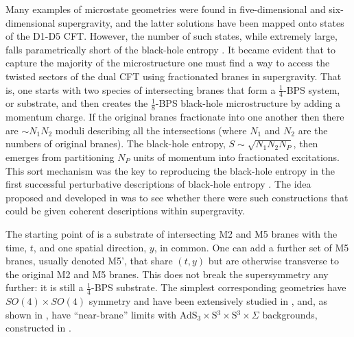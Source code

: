 \documentclass[11pt]{article}
\def\nBPS#1{$\frac{1}{#1}$-BPS}
\numberwithin{equation}{section}
\begin{document}
Many examples of microstate geometries were found in five-dimensional \cite{Giusto:2004kj,Bena:2005va,Berglund:2005vb,Bena:2006is,Bena:2006kb,Bena:2007kg,Bena:2007qc,Bena:2008wt,Bena:2010gg,Gibbons:2013tqa,Bena:2011dd, Bena:2013dka, Bianchi:2016bgx, Bianchi:2017bxl, Heidmann:2017cxt, Bena:2017fvm, Avila:2017pwi,Tyukov:2018ypq,Warner:2019jll} and six-dimensional \cite{Shigemori:2013lta,Giusto:2013bda,Bena:2015bea,Bena:2016ypk,Bena:2017geu,Bena:2017upb,Bena:2017xbt,Ceplak:2018pws,Heidmann:2019xrd,Heidmann:2019zws,Walker:2019ntz,Ganchev:2021iwy}  supergravity, and the latter solutions have been mapped onto states of the D1-D5 CFT.  However, the number of such states, while extremely large, falls parametrically short of the black-hole entropy \cite{Shigemori:2019orj,Mayerson:2020acj}.    It became evident that to capture the majority of the microstructure one must find a way to access the twisted sectors of the dual CFT using fractionated branes in supergravity.   That is, one starts with two species of intersecting branes that form  a \nBPS{4}  system, or substrate, and then creates the  \nBPS{8} black-hole microstructure by adding a momentum charge.   If the original branes fractionate into one another then there are  $\sim N_1 N_2$ moduli describing all the intersections (where  $N_1$ and $N_2$ are the numbers of original branes).   The black-hole entropy, $S \sim \sqrt{N_1 N_2 N_P}$, then emerges from partitioning $N_P$ units of momentum into fractionated excitations.  This sort mechanism was the key to reproducing the black-hole entropy in  the first successful perturbative descriptions of black-hole entropy \cite{Strominger:1996sh,Maldacena:1997de,Dijkgraaf:1996cv}.    The idea proposed and developed in  \cite{Bena:2022wpl,Bena:2022fzf,Bena:2023rzm,Bena:2024qed,Bena:2024dre,Bena:2025hxt} was to see whether there were such constructions that could be given coherent descriptions within supergravity. 

The starting point of   \cite{Bena:2023rzm,Bena:2024qed,Bena:2024dre,Bena:2025hxt} is a substrate of intersecting M2 and M5 branes with the time, $t$, and one spatial direction, $y$, in common.  One can add a further set of M5 branes, usually denoted M5', that share $(t,y)$ but are otherwise transverse to the original M2 and M5 branes.  This does not break the supersymmetry any further: it is still a \nBPS{4} substrate.  The simplest corresponding geometries have $SO(4) \times SO(4)$ symmetry and have been extensively studied in \cite{Lunin:2007ab,Lunin:2007mj,Lunin:2008tf,Bena:2023rzm,Bena:2024dre,Bena:2025hxt}, and, as shown in \cite{Bena:2023rzm,Bena:2024dre,Bena:2025hxt}, have ``near-brane'' limits with   AdS$_3 \times$S$^3 \times$S$^3 \times \Sigma$ backgrounds,  constructed in \cite{Bachas:2013vza}.   
\end{document}
